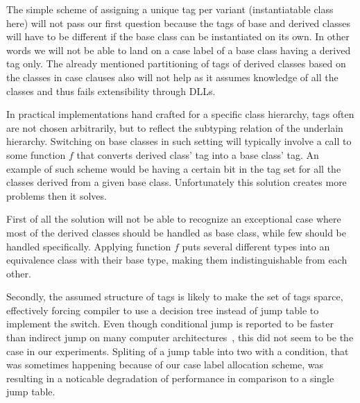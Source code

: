\documentclass[preprint]{sigplanconf}
\begin{document}


The simple scheme of assigning a unique tag per variant (instantiatable class 
here) will not pass our first question because the tags of base and derived 
classes will have to be different if the base class can be instantiated on its 
own. In other words we will not be able to land on a case label of a base class 
having a derived tag only. The already mentioned partitioning of tags of derived 
classes based on the classes in case clauses also will not help as it assumes 
knowledge of all the classes and thus fails extensibility through DLLs.

In practical implementations hand crafted for a specific class hierarchy, tags 
often are not chosen arbitrarily, but to reflect the subtyping relation of the 
underlain hierarchy. Switching on base classes in such setting will typically 
involve a call to some function $f$ that converts derived class' tag into a base 
class' tag. An example of such scheme would be having a certain bit in the tag 
set for all the classes derived from a given base class. Unfortunately this 
solution creates more problems then it solves.

First of all the solution will not be able to recognize an exceptional case 
where most of the derived classes should be handled as base class, while few 
should be handled specifically. Applying function $f$ puts several different 
types into an equivalence class with their base type, making them 
indistinguishable from each other.

Secondly, the assumed structure of tags is likely to make the set of tags 
sparce, effectively forcing compiler to use a decision tree instead of jump 
table to implement the switch. Even though conditional jump is reported to be 
faster than indirect jump on many computer architectures~\cite[]{garrigue-98}, this did not seem to be the case in our experiments. Spliting 
of a jump table into two with a condition, that was sometimes happening because 
of our case label allocation scheme, was resulting in a noticable degradation of 
performance in comparison to a single jump table.
\end{document}
